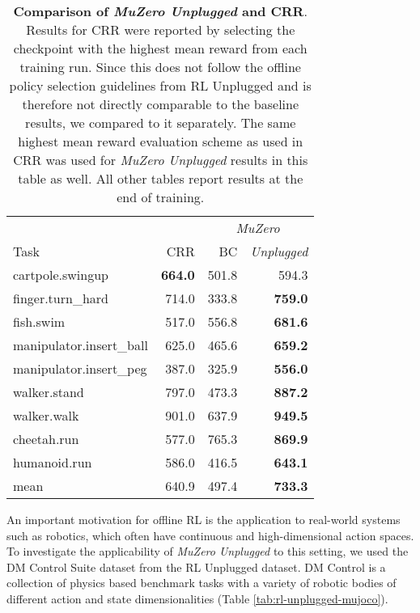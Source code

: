 \documentclass{article}
\newcommand{\muzero}{\emph{MuZero}}
\newcommand{\mzunplugged}{\emph{MuZero Unplugged}}
\begin{document}
\begin{table}[t]
\begin{center}\begin{tabularx}{\columnwidth}{l|r|rr}
  \toprule
   &  & \multicolumn{2}{c}{\muzero{}} \\
  Task & CRR & BC & \emph{Unplugged} \\
\midrule
cartpole.swingup & \textbf{664.0} & 501.8 & 594.3 \\
finger.turn\_hard & 714.0 & 333.8 & \textbf{759.0} \\
fish.swim & 517.0 & 556.8 & \textbf{681.6} \\
manipulator.insert\_ball & 625.0 & 465.6 & \textbf{659.2} \\
manipulator.insert\_peg & 387.0 & 325.9 & \textbf{556.0} \\
walker.stand & 797.0 & 473.3 & \textbf{887.2} \\
walker.walk & 901.0 & 637.9 & \textbf{949.5} \\
cheetah.run & 577.0 & 765.3 & \textbf{869.9} \\
humanoid.run & 586.0 & 416.5 & \textbf{643.1} \\
\midrule
mean & 640.9 & 497.4 & \textbf{733.3}\\
\bottomrule
\end{tabularx}
\end{center}
 \caption{
\label{tab:rl-unplugged-mujoco-crr}
\textbf{Comparison of \mzunplugged{} and CRR}. Results for CRR \cite{wang2020critic} were reported by selecting the checkpoint with the highest mean reward from each training run. Since this does not follow the offline policy selection guidelines from RL Unplugged and is therefore not directly comparable to the baseline results, we compared to it separately. The same highest mean reward evaluation scheme as used in CRR was used for \mzunplugged{} results in this table as well. All other tables report results at the end of training.
}
\end{table}


An important motivation for offline RL is the application to real-world systems such as robotics, which often have continuous and high-dimensional action spaces. To investigate the applicability of \mzunplugged{} to this setting, we used the DM Control Suite dataset from the RL Unplugged dataset. DM Control is a collection of physics based benchmark tasks \cite{tassa2018deepmind} with a variety of robotic bodies of different action and state dimensionalities (Table \ref{tab:rl-unplugged-mujoco}).
\end{document}
